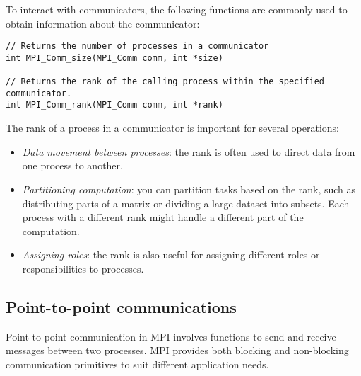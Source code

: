 To interact with communicators, the following functions are commonly used to obtain information about the communicator:
\begin{lstlisting}[style=C]
// Returns the number of processes in a communicator
int MPI_Comm_size(MPI_Comm comm, int *size)

// Returns the rank of the calling process within the specified communicator.
int MPI_Comm_rank(MPI_Comm comm, int *rank)
\end{lstlisting}
The rank of a process in a communicator is important for several operations:
\begin{itemize}
    \item \textit{Data movement between processes}: the rank is often used to direct data from one process to another.
    \item \textit{Partitioning computation}: you can partition tasks based on the rank, such as distributing parts of a matrix or dividing a large dataset into subsets. 
        Each process with a different rank might handle a different part of the computation.
    \item \textit{Assigning roles}: the rank is also useful for assigning different roles or responsibilities to processes.
\end{itemize}

\subsection{Point-to-point communications}
Point-to-point communication in MPI involves functions to send and receive messages between two processes. 
MPI provides both blocking and non-blocking communication primitives to suit different application needs.

